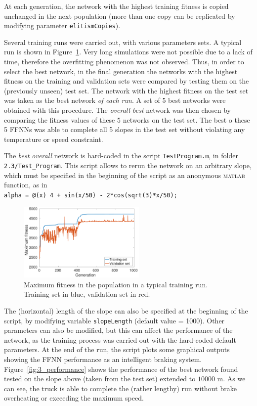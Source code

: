 \documentclass[12pt,titlepage]{article}
\begin{document}
At each generation, the network with the highest training fitness is copied unchanged in the next population (more than one copy can be replicated by modifying parameter \texttt{elitismCopies}).

\bigskip
Several training runs were carried out, with various parameters sets. A typical run is shown in Figure~\ref{fig:3_fitness}. Very long simulations were not possible due to a lack of time, therefore the overfitting phenomenon was not observed. Thus, in order to select the best network, in the final generation the networks with the highest fitness on the training and validation sets were compared by testing them on the (previously unseen) test set. The network with the highest fitness on the test set was taken as the best network \emph{of each run}. A set of 5 best networks were obtained with this procedure. The \emph{overall best} network was then chosen by comparing the fitness values of these 5 networks on the test set. The best o these 5 FFNNs was able to complete all 5 slopes in the test set without violating any temperature or speed constraint.

The \emph{best overall} network is hard-coded in the script \texttt{TestProgram.m}, in folder \texttt{2.3/Test\_Program}. This script allows to rerun the network on an arbitrary slope, which must be specified in the beginning of the script as an anonymous \textsc{matlab} function, as in\\
\hspace*{3cm} \texttt{alpha = @(x) 4 + sin(x/50) - 2*cos(sqrt(3)*x/50);}

\begin{figure}[htbp]
\centering
\includegraphics[width=0.55\textwidth]{Figures/3_fitness}
\caption{\footnotesize Maximum fitness in the population in a typical training run. Training set in blue, validation set in red.}
\label{fig:3_fitness}
\end{figure}

\vspace*{-1cm}
The (horizontal) length of the slope can also be specified at the beginning of the script, by modifying variable \texttt{slopeLength} (default value = 1000). Other parameters can also be modified, but this can affect the performance of the network, as the training process was carried out with the hard-coded default parameters.
At the end of the run, the script plots some graphical outputs showing the FFNN performance as an intelligent braking system. Figure~\ref{fig:3_performance} shows the performance of the best network found tested on the slope above (taken from the test set) extended to $10000$ m. As we can see, the truck is able to complete the (rather lengthy) run without brake overheating or exceeding the maximum speed.
\end{document}

